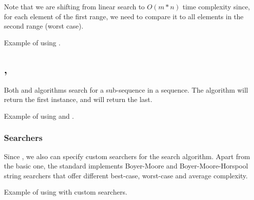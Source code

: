 
Note that we are shifting from linear search to $O(m*n)$ time complexity since, for each element of the first range, we need to compare it to all elements in the second range (worst case).

\begin{box-note}
\footnotesize Example of using .
\tcblower
{}
\end{box-note}

\subsection{\texorpdfstring{, }{\texttt{std::search}, \texttt{std::find\_end}}}

Both  and  algorithms search for a sub-sequence in a sequence.
The  algorithm will return the first instance, and  will return the last.


\begin{box-note}
\footnotesize Example of using  and .
\tcblower
{}
\end{box-note}

\subsubsection{Searchers}

Since , we also can specify custom searchers for the search algorithm. Apart from the basic one, the standard implements Boyer-Moore and Boyer-Moore-Horspool string searchers that offer different best-case, worst-case and average complexity.

\begin{box-note}
\footnotesize Example of using  with custom searchers.
\tcblower
{}
\end{box-note}

